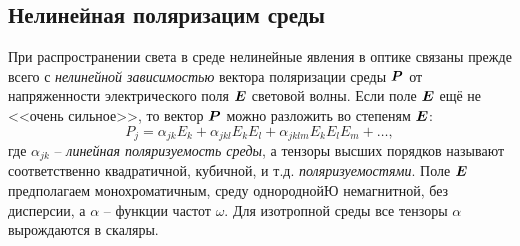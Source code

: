 \subsection{Нелинейная поляризацим среды}


При распространении света в среде нелинейные явления в оптике связаны прежде всего с \textit{нелинейной зависимостью} вектора поляризации среды $\mbox{\boldmath $P$}$ от напряженности электрического поля $\mbox{\boldmath $E$}$ световой волны. Если поле $\mbox{\boldmath $E$}$ ещё не <<очень сильное>>, то вектор $\mbox{\boldmath $P$}$ можно разложить во степеням $\mbox{\boldmath $E$}$:
\begin{equation*}
    P_j = \alpha_{jk} E_k + \alpha_{jkl} E_k E_l + \alpha_{jklm} E_k E_l E_m + \ldots, 
\end{equation*}
где $\alpha_{jk}$ -- \textit{линейная поляризуемость среды}, а тензоры высших порядков называют соответственно квадратичной, кубичной, и т.д. \textit{поляризуемостями}. Поле $\mbox{\boldmath $E$}$ предполагаем монохроматичным, среду однороднойЮ немагнитной, без дисперсии, а $\alpha$ -- функции частот $\omega$. Для изотропной среды все тензоры $\alpha$ вырождаются в скаляры. 



